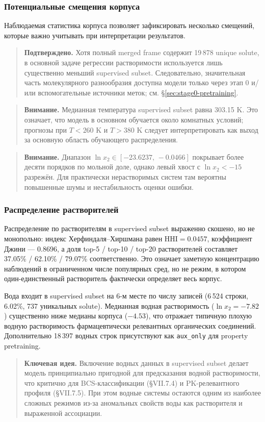 \documentclass[11pt]{article}
\newcommand{\warnnote}[1]{\begin{quote}\textbf{Внимание.} #1\end{quote}}
\newcommand{\keyidea}[1]{\begin{quote}\textbf{Ключевая идея.} #1\end{quote}}
\newcommand{\validated}[1]{\begin{quote}\textbf{Подтверждено.} #1\end{quote}}
\begin{document}
\subsubsection{Потенциальные смещения корпуса}

Наблюдаемая статистика корпуса позволяет зафиксировать несколько смещений, которые важно учитывать при интерпретации результатов.

\validated{Хотя полный merged frame содержит 19\,878 unique solute, в основной задаче регрессии растворимости используется лишь существенно меньший supervised subset. Следовательно, значительная часть молекулярного разнообразия доступна модели только через этап 0 и/или вспомогательные источники меток; см. §\ref{sec:stage0-pretraining}.}

\warnnote{Медианная температура supervised subset равна 303.15 K. Это означает, что модель в основном обучается около комнатных условий; прогнозы при $T < 260$ K и $T > 380$ K следует интерпретировать как выход за основную область обучающего распределения.}

\warnnote{Диапазон $\ln x_2 \in [-23.6237,\, -0.0466]$ покрывает более десяти порядков по мольной доле, однако левый хвост с $\ln x_2 < -15$ разрежён. Для практически нерастворимых систем там вероятны повышенные шумы и нестабильность оценки ошибки.}

\subsubsection{Распределение растворителей}

Распределение по растворителям в supervised subset выраженно скошено, но не монопольно: индекс Херфиндаля--Хиршмана равен $\mathrm{HHI}=0.0457$, коэффициент Джини --- $0.8696$, а доля top-5 / top-10 / top-20 растворителей составляет 37.05\% / 62.10\% / 79.07\% соответственно. Это означает заметную концентрацию наблюдений в ограниченном числе популярных сред, но не режим, в котором один-единственный растворитель фактически определяет весь корпус.

Вода входит в supervised subset на 6-м месте по числу записей (6\,524 строки, 6.02\%, 737 уникальных solute). Медианная водная растворимость ($\ln x_2 = -7.82$) существенно ниже медианы корпуса ($-4.53$), что отражает типичную плохую водную растворимость фармацевтически релевантных органических соединений. Дополнительно 18\,397 водных строк присутствуют как \texttt{aux\_only} для property pretraining.

\keyidea{Включение водных данных в supervised subset делает модель принципиально пригодной для предсказания водной растворимости, что критично для BCS-классификации (§VII.7.4) и PK-релевантного профиля (§VII.7.5). При этом водные системы остаются одним из наиболее сложных режимов из-за аномальных свойств воды как растворителя и выраженной ассоциации.}
\end{document}
